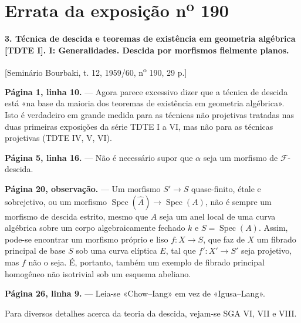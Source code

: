 \clearpage
\chapter*{Errata da exposição n\textsuperscript{o} 190}
\setcounter{footnote}{0}

\noindent\textbf{3. Técnica de descida e teoremas de existência em geometria
algébrica [TDTE I]. I: Generalidades. Descida por morfismos fielmente planos.}

\begin{center}
[Seminário Bourbaki, t. 12, 1959/60, n\textsuperscript{o} 190, 29 p.]
\end{center}

\noindent\textbf{Página 1, linha 10.} --- Agora parece excessivo dizer que a
técnica de descida está «na base da maioria dos teoremas de
existência em geometria algébrica». Isto é verdadeiro em grande medida para as
técnicas não projetivas tratadas nas duas primeiras exposições
da série TDTE I a VI, mas não para as técnicas projetivas (TDTE IV, V,
VI).

\noindent\textbf{Página 5, linha 16.} --- Não é necessário supor que $\alpha$
seja um morfismo de $\mathcal F$-descida.

\noindent\textbf{Página 20, observação.} --- Um morfismo
$S'\longrightarrow S$ quase-finito, étale e sobrejetivo, ou um morfismo
$\operatorname{Spec}(\widehat A)\longrightarrow\operatorname{Spec}(A)$, não é
sempre um morfismo de descida estrito, mesmo que $A$ seja um anel local de uma
curva algébrica sobre um corpo algebraicamente fechado $k$ e
$S=\operatorname{Spec}(A)$. Assim, pode-se encontrar um morfismo próprio e liso
$f:X\longrightarrow S$, que faz de $X$ um fibrado principal de base $S$ sob
uma curva elíptica $E$, tal que $f':X'\longrightarrow S'$ seja projetivo, mas
$f$ não o seja. É, portanto, também um exemplo de fibrado
principal homogêneo não isotrivial sob um esquema abeliano.

\noindent\textbf{Página 26, linha 9.} --- Leia-se «Chow--Iang» em vez de
«Igusa--Lang».

Para diversos detalhes acerca da teoria da descida, vejam-se SGA VI, VII e
VIII.

\par
